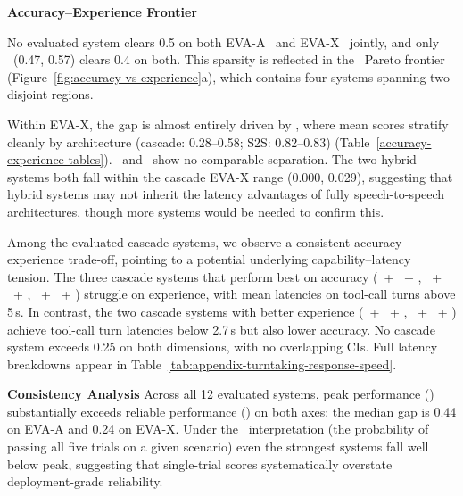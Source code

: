 



\textbf{Accuracy–Experience Frontier}

No evaluated system clears 0.5 on both EVA-A \passatone\ and EVA-X \passatone\ jointly, and only \gptrealtime~(0.47, 0.57) clears 0.4 on both. This sparsity is reflected in the \passatone\ Pareto frontier (Figure~\ref{fig:accuracy-vs-experience}a), which contains four systems spanning two disjoint regions.

Within EVA-X, the gap is almost entirely driven by \metricturntaking, where mean scores stratify cleanly by architecture (cascade: 0.28–0.58; S2S: 0.82–0.83) (Table~\ref{accuracy-experience-tables}). \metricconcise~and \metricconversationprogression~show no comparable separation. The two hybrid systems both fall within the cascade EVA-X range (0.000, 0.029), suggesting that hybrid systems may not inherit the latency advantages of fully speech-to-speech architectures, though more systems would be needed to confirm this.

Among the evaluated cascade systems, we observe a consistent accuracy–experience trade-off, pointing to a potential underlying capability–latency tension. The three cascade systems that perform best on accuracy (\nova~+ \gpt~+ \sonic, \scribe~+ \geminiflash~+ \conversational, \parakeet~+ \gemmaB~+ \kokoro) struggle on experience, with mean latencies on tool-call turns above 5\,s. In contrast, the two cascade systems with better experience (\whisper~+ \qwen~+ \voxtral, \cohere~+ \gemmaA~+ \voxtral) achieve tool-call turn latencies below 2.7\,s but also lower accuracy. No cascade system exceeds 0.25 on both dimensions, with no overlapping CIs. Full latency breakdowns appear in Table~\ref{tab:appendix-turntaking-response-speed}.

\textbf{Consistency Analysis}
Across all 12 evaluated systems, peak performance (\passatk) substantially exceeds reliable performance (\passpowerk) on both axes: the median gap is 0.44 on EVA-A and 0.24 on EVA-X. Under the \passpowerk~interpretation (the probability of passing all five trials on a given scenario) even the strongest systems fall well below peak, suggesting that single-trial scores systematically overstate deployment-grade reliability.

